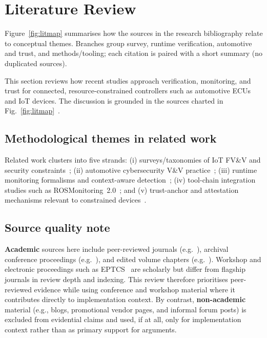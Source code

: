 \section{Literature Review}
\label{sec:Lit}

Figure~\ref{fig:litmap} summarises how the sources in the research bibliography relate to conceptual themes. Branches group survey, runtime verification, automotive and trust, and methods/tooling; each citation is paired with a short summary (no duplicated sources).



This section reviews how recent studies approach verification, monitoring, and trust for connected, resource-constrained controllers such as automotive ECUs and IoT devices. The discussion is grounded in the sources charted in Fig.~\ref{fig:litmap}~\cite{williams2022survey,krichen2023survey,kuang2021remote,zhang2024context,dehoz2022iotdt,jaksic2018algebraic,saadat2024rosmonitoring2,clemens2018runtime,incki2018novel,mehran2024containers,goodloe2023highassurance,ekert2021cybersecurity,lorych2024hta,plappert2023hta,aman2020hatt,colombo2009larva,abela2023rvtee,saunders2016research}.

\subsection{Methodological themes in related work}

Related work clusters into five strands: (i) surveys/taxonomies of IoT FV\&V and security constraints~\cite{krichen2023survey,williams2022survey}; (ii) automotive cybersecurity V\&V practice~\cite{ekert2021cybersecurity}; (iii) runtime monitoring formalisms and context-aware detection~\cite{zhang2024context,dehoz2022iotdt,jaksic2018algebraic}; (iv) tool-chain integration studies such as ROSMonitoring~2.0~\cite{saadat2024rosmonitoring2}; and (v) trust-anchor and attestation mechanisms relevant to constrained devices~\cite{plappert2023hta,lorych2024hta,aman2020hatt}.

\subsection{Source quality note}

\textbf{Academic} sources here include peer-reviewed journals (e.g.~\cite{ekert2021cybersecurity,williams2022survey,plappert2023hta,zhang2024context,krichen2023survey}), archival conference proceedings (e.g.~\cite{lorych2024hta}), and edited volume chapters (e.g.~\cite{dehoz2022iotdt}). Workshop and electronic proceedings such as EPTCS~\cite{saadat2024rosmonitoring2} are scholarly but differ from flagship journals in review depth and indexing. This review therefore prioritises peer-reviewed evidence while using conference and workshop material where it contributes directly to implementation context.
By contrast, \textbf{non-academic} material (e.g., blogs, promotional vendor pages, and informal forum posts) is excluded from evidential claims and used, if at all, only for implementation context rather than as primary support for arguments.

